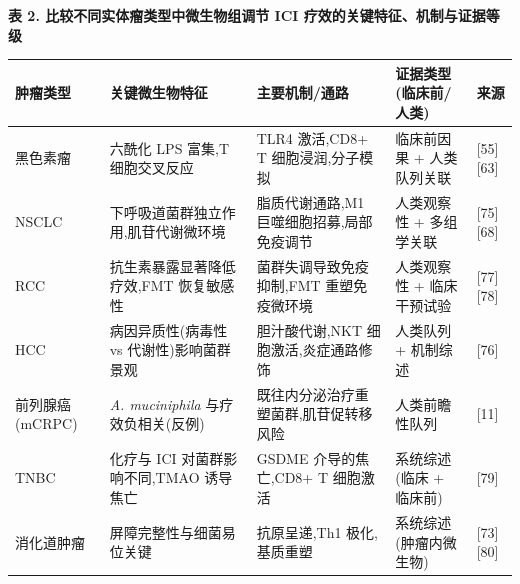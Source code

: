 \documentclass[11pt]{article}
\newcounter{none}
\begin{document}
\textbf{表 2. 比较不同实体瘤类型中微生物组调节 ICI 疗效的关键特征、机制与证据等级}

{\def\LTcaptype{none} %
\begin{longtable}[]{@{}
  >{\raggedright\arraybackslash}p{}
  >{\raggedright\arraybackslash}p{}
  >{\raggedright\arraybackslash}p{}
  >{\raggedright\arraybackslash}p{}
  >{\raggedright\arraybackslash}p{}@{}}
\toprule\noalign{}
\begin{minipage}[b]{\linewidth}\raggedright
肿瘤类型
\end{minipage} & \begin{minipage}[b]{\linewidth}\raggedright
关键微生物特征
\end{minipage} & \begin{minipage}[b]{\linewidth}\raggedright
主要机制/通路
\end{minipage} & \begin{minipage}[b]{\linewidth}\raggedright
证据类型 (临床前/人类)
\end{minipage} & \begin{minipage}[b]{\linewidth}\raggedright
来源
\end{minipage} \\
\midrule\noalign{}
\endhead
\bottomrule\noalign{}
\endlastfoot
黑色素瘤 & 六酰化 LPS 富集,T 细胞交叉反应 & TLR4 激活,CD8+ T 细胞浸润,分子模拟 & 临床前因果 + 人类队列关联 & {[}55{]}{[}63{]} \\
NSCLC & 下呼吸道菌群独立作用,肌苷代谢微环境 & 脂质代谢通路,M1 巨噬细胞招募,局部免疫调节 & 人类观察性 + 多组学关联 & {[}75{]}{[}68{]} \\
RCC & 抗生素暴露显著降低疗效,FMT 恢复敏感性 & 菌群失调导致免疫抑制,FMT 重塑免疫微环境 & 人类观察性 + 临床干预试验 & {[}77{]}{[}78{]} \\
HCC & 病因异质性(病毒性 vs 代谢性)影响菌群景观 & 胆汁酸代谢,NKT 细胞激活,炎症通路修饰 & 人类队列 + 机制综述 & {[}76{]} \\
前列腺癌 (mCRPC) & \emph{A. muciniphila} 与疗效负相关(反例) & 既往内分泌治疗重塑菌群,肌苷促转移风险 & 人类前瞻性队列 & {[}11{]} \\
TNBC & 化疗与 ICI 对菌群影响不同,TMAO 诱导焦亡 & GSDME 介导的焦亡,CD8+ T 细胞激活 & 系统综述 (临床 + 临床前) & {[}79{]} \\
消化道肿瘤 & 屏障完整性与细菌易位关键 & 抗原呈递,Th1 极化,基质重塑 & 系统综述 (肿瘤内微生物) & {[}73{]}{[}80{]} \\
\end{longtable}
}
\end{document}
